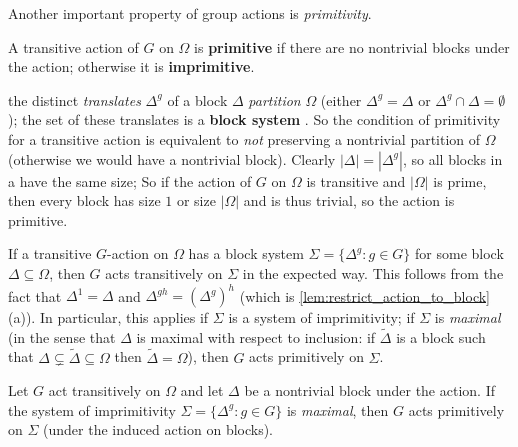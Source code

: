 Another important property of group actions is \textit{primitivity}.

\begin{definition}\label{def:primitive_action}
    A transitive action of $G$ on $\Omega$ is \textbf{primitive} if there are no nontrivial blocks under the action; otherwise it is \textbf{imprimitive}.
\end{definition}

 the distinct \textit{translates} $\Delta^g$ of a block $\Delta$ \textit{partition} $\Omega$ (either $\Delta^g = \Delta$ or $\Delta^g \cap \Delta = \emptyset$); the set  of these translates  is a \textbf{block system} . So the condition of primitivity for a transitive action is equivalent to \textit{not} preserving a nontrivial partition of $\Omega$ (otherwise we would have a nontrivial block). Clearly $|\Delta| = |\Delta^g|$, so all blocks in a  have the same size;  So if the action of $G$ on $\Omega$ is transitive and $|\Omega|$ is prime, then every block has size $1$ or size $|\Omega|$ and is thus trivial, so the action is primitive. 

If a transitive $G$-action on $\Omega$ has a block system $\Sigma = \{\Delta^g :  g \in G\}$ for some block $\Delta \subseteq \Omega$, then $G$ acts transitively on $\Sigma$ in the expected way. This follows from the fact that $\Delta^1 = \Delta$ and $\Delta^{gh} = (\Delta^g)^h$ (which is \autoref{lem:restrict_action_to_block}(a)). In particular, this applies if $\Sigma$ is a system of imprimitivity; if $\Sigma$ is \textit{maximal} (in the sense that $\Delta$ is maximal with respect to inclusion: if $\tilde\Delta$ is a block such that $\Delta \subsetneq \tilde\Delta \subseteq \Omega$ then $\tilde\Delta = \Omega$), then $G$ acts primitively on $\Sigma$.

\begin{lemma}\label{lem:action_on_blocks_primitive_if_maximal}
    Let $G$ act transitively on $\Omega$ and let $\Delta$ be a nontrivial block under the action. If the system of imprimitivity $\Sigma = \{\Delta^g :  g \in G\}$ is \textit{maximal}, then $G$ acts primitively on $\Sigma$ (under the induced action on blocks).
\end{lemma}

